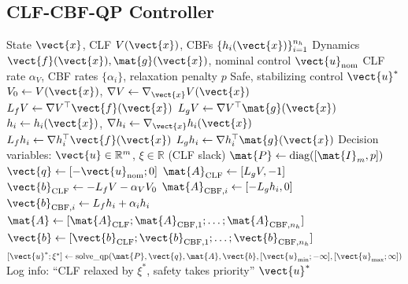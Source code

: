 \subsection{CLF-CBF-QP Controller}
\label{subsec:alg_clf_cbf}

\begin{algorithm}[H]
\caption{Combined CLF-CBF-QP Controller}
\label{alg:clf_cbf_qp_impl}
\begin{algorithmic}[1]
\REQUIRE State $\vect{x}$, CLF $V(\vect{x})$, CBFs $\{h_i(\vect{x})\}_{i=1}^{n_h}$
\REQUIRE Dynamics $\vect{f}(\vect{x}), \mat{g}(\vect{x})$, nominal control $\vect{u}_{\text{nom}}$
\REQUIRE CLF rate $\alpha_V$, CBF rates $\{\alpha_i\}$, relaxation penalty $p$
\ENSURE Safe, stabilizing control $\vect{u}^*$
\STATE
\STATE {}
\STATE $V_0 \gets V(\vect{x})$, $\nabla V \gets \nabla_{\vect{x}} V(\vect{x})$
\STATE $L_f V \gets \nabla V^\top \vect{f}(\vect{x})$
\STATE $L_g V \gets \nabla V^\top \mat{g}(\vect{x})$
\STATE
\STATE {}
    \STATE $h_i \gets h_i(\vect{x})$, $\nabla h_i \gets \nabla_{\vect{x}} h_i(\vect{x})$
    \STATE $L_f h_i \gets \nabla h_i^\top \vect{f}(\vect{x})$
    \STATE $L_g h_i \gets \nabla h_i^\top \mat{g}(\vect{x})$
\ENDFOR
\STATE
\STATE {}
\STATE Decision variables: $\vect{u} \in \mathbb{R}^m$, $\xi \in \mathbb{R}$ (CLF slack)
\STATE
\STATE {}
\STATE $\mat{P} \gets \text{diag}([\mat{I}_m, p])$
\STATE $\vect{q} \gets [-\vect{u}_{\text{nom}}; 0]$
\STATE
\STATE {}
\STATE $\mat{A}_{\text{CLF}} \gets [L_g V, -1]$
\STATE $\vect{b}_{\text{CLF}} \gets -L_f V - \alpha_V V_0$
\STATE
\STATE {}
    \STATE $\mat{A}_{\text{CBF},i} \gets [-L_g h_i, 0]$
    \STATE $\vect{b}_{\text{CBF},i} \gets L_f h_i + \alpha_i h_i$
\ENDFOR
\STATE
\STATE {}
\STATE $\mat{A} \gets [\mat{A}_{\text{CLF}}; \mat{A}_{\text{CBF},1}; \ldots; \mat{A}_{\text{CBF},n_h}]$
\STATE $\vect{b} \gets [\vect{b}_{\text{CLF}}; \vect{b}_{\text{CBF},1}; \ldots; \vect{b}_{\text{CBF},n_h}]$
\STATE
\STATE $[\vect{u}^*; \xi^*] \gets \text{solve\_qp}(\mat{P}, \vect{q}, \mat{A}, \vect{b}, [\vect{u}_{\min}; -\infty], [\vect{u}_{\max}; \infty])$
\STATE
\IF{$\xi^* > \epsilon$}
    \STATE Log info: ``CLF relaxed by $\xi^*$, safety takes priority''
\ENDIF
\RETURN $\vect{u}^*$
\end{algorithmic}
\end{algorithm}

